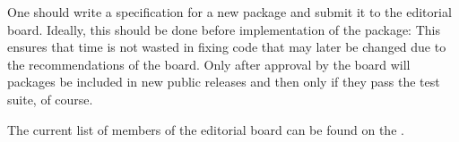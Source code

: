 One should write a specification for a new package
and submit it to the editorial board.
Ideally, this should be done before implementation of the package: This
ensures that time is not wasted in fixing code that may later be changed
due to the recommendations of the board.
Only after approval by the board will packages be included in new
public releases and then only if they pass the test suite, of course.

The current list of members of the editorial board can be found on the 
.
